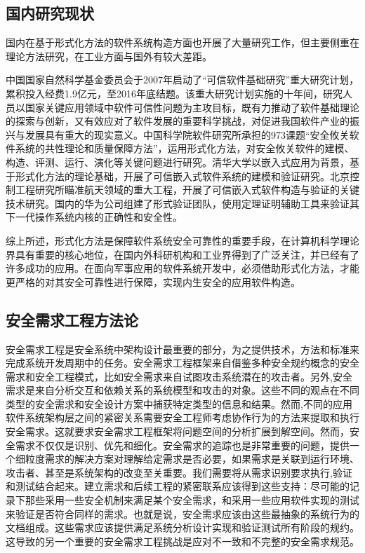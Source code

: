 \subsection{国内研究现状}
\par
国内在基于形式化方法的软件系统构造方面也开展了大量研究工作，但主要侧重在理论方法研究，在工业方面与国外有较大差距。
\par
中国国家自然科学基金委员会于2007年启动了“可信软件基础研究”重大研究计划，累积投入经费1.9亿元，至2016年底结题。该重大研究计划实施的十年间，研究人员以国家关键应用领域中软件可信性问题为主攻目标，既有力推动了软件基础理论的探索与创新，又有效应对了软件发展的重要科学挑战，对促进我国软件产业的振兴与发展具有重大的现实意义。中国科学院软件研究所承担的973课题“安全攸关软件系统的共性理论和质量保障方法”，运用形式化方法，对安全攸关软件的建模、构造、评测、运行、演化等关键问题进行研究。清华大学以嵌入式应用为背景，基于形式化方法的理论基础，开展了可信嵌入式软件系统的建模和验证研究。北京控制工程研究所瞄准航天领域的重大工程，开展了可信嵌入式软件构造与验证的关键技术研究。国内的华为公司组建了形式验证团队，使用定理证明辅助工具来验证其下一代操作系统内核的正确性和安全性。
\par
综上所述，形式化方法是保障软件系统安全可靠性的重要手段，在计算机科学理论界具有重要的核心地位，在国内外科研机构和工业界得到了广泛关注，并已经有了许多成功的应用。在面向军事应用的软件系统开发中，必须借助形式化方法，才能更严格的对其安全可靠性进行保障，实现内生安全的应用软件构造。
\subsection{安全需求工程方法论}
\par
安全需求工程是安全系统中架构设计最重要的部分，为之提供技术，方法和标准来完成系统开发周期中的任务。安全需求工程框架来自借鉴多种安全规约概念的安全需求和安全工程模式，比如安全需求来自试图攻击系统潜在的攻击者。另外,安全需求是来自分析交互和依赖关系的系统模型和攻击的对象。这些不同的观点在不同类型的安全需求和安全设计方案中捕获特定类型的信息和结果。然而,不同的应用软件系统架构层之间的紧密关系需要安全工程师考虑协作行为的方法来提取和执行安全需求。这就要求安全需求工程框架将问题空间的分析扩展到解空间。然而，安全需求不仅仅是识别、优先和细化。安全需求的追踪也是非常重要的问题，提供一个细粒度需求的解决方案对理解给定需求是否必要，如果需求是关联到运行环境、攻击者、甚至是系统架构的改变至关重要。我们需要将从需求识别要求执行,验证和测试结合起来。建立需求和后续工程的紧密联系应该得到这些支持：尽可能的记录下那些采用一些安全机制来满足某个安全需求，和采用一些应用软件实现的测试来验证是否符合同样的需求。也就是说，安全需求应该由这些最抽象的系统行为的文档组成。这些需求应该提供满足系统分析设计实现和验证测试所有阶段的规约。这导致的另一个重要的安全需求工程挑战是应对不一致和不完整的安全需求规范。
